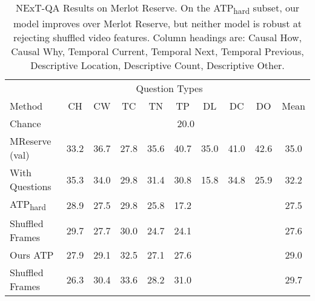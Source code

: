 \begin{table}[t]
	\centering
	\caption{NExT-QA Results on Merlot Reserve. On the ATP\textsubscript{hard}
		subset, our model improves over Merlot Reserve, but neither model is
		robust at rejecting shuffled video features.  Column headings are:
		Causal How, Causal Why,
	Temporal Current, Temporal Next, Temporal Previous, Descriptive Location,
	Descriptive Count, Descriptive Other.}
	\label{tab:nextqa}
	\begin{tabular}{lccccccccc}
		\toprule
		\multicolumn{1}{c}{}  & \multicolumn{8}{c}{Question Types} & \multicolumn{1}{c}{}   \\
                                      \cmidrule(){2-9}
		Method			      &  CH  &  CW  &  TC  &  TN  &  TP  &  DL  &  DC  &  DO  & Mean \\
		\cmidrule(r){1-1}             \cmidrule(){2-10}
		Chance				  & \multicolumn{9}{c}{20.0} \\
		\cmidrule(r){1-1}             \cmidrule(){2-10}
		MReserve (val)        & 33.2 & 36.7 & 27.8 & 35.6 & 40.7 & 35.0 & 41.0 & 42.6 & 35.0 \\
		With Questions		  & 35.3 & 34.0 & 29.8 & 31.4 & 30.8 & 15.8 & 34.8 & 25.9 & 32.2 \\
		\midrule
		\midrule
		ATP\textsubscript{hard}	&28.9 & 27.5 & 29.8 & 25.8 &17.2 &  	&      &      & 27.5 \\
		Shuffled Frames		  & 29.7 & 27.7 & 30.0 & 24.7 & 24.1 &      &      &      & 27.6 \\
		\cmidrule(r){1-1}             \cmidrule(){2-10}
		Ours ATP			  & 27.9 & 29.1 & 32.5 & 27.1 & 27.6 & & & & 29.0 \\
		Shuffled Frames		  &	26.3 & 30.4	& 33.6 & 28.2 &	31.0 & & & & 29.7 \\
		\bottomrule
	\end{tabular}
\end{table}



